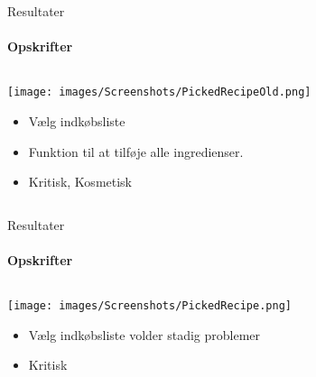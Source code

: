 \begin{frame}{Resultater}
\framesubtitle{Opskrifter}

	
	\begin{minipage}[0.3\textheight]{\textwidth}
	\begin{columns}[T]
	\begin{column}{1\textwidth}
	 \texttt{[image: images/Screenshots/PickedRecipeOld.png]}
	 
		\begin{itemize}
		\item Vælg indkøbsliste
		\item Funktion til at tilføje alle ingredienser.
		\item Kritisk, Kosmetisk
		\end{itemize}
	\end{column}

	\end{columns}

  \end{minipage}
	
\end{frame}
\begin{frame}{Resultater}
\framesubtitle{Opskrifter}

	
	\begin{minipage}[0.3\textheight]{\textwidth}
	\begin{columns}[T]
	\begin{column}{1\textwidth}
	 \texttt{[image: images/Screenshots/PickedRecipe.png]}
	 
	 	\begin{itemize}
	 		\item Vælg indkøbsliste volder stadig problemer
	 		\item Kritisk
	 	\end{itemize}
	
	\end{column}

	\end{columns}

  \end{minipage}
	
\end{frame}

